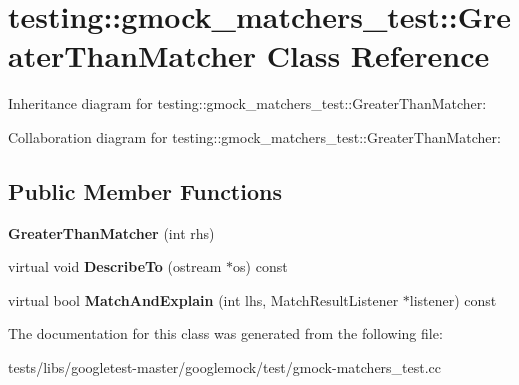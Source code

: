 \hypertarget{classtesting_1_1gmock__matchers__test_1_1GreaterThanMatcher}{}\section{testing\+:\+:gmock\+\_\+matchers\+\_\+test\+:\+:Greater\+Than\+Matcher Class Reference}
\label{classtesting_1_1gmock__matchers__test_1_1GreaterThanMatcher}


Inheritance diagram for testing\+:\+:gmock\+\_\+matchers\+\_\+test\+:\+:Greater\+Than\+Matcher\+:


Collaboration diagram for testing\+:\+:gmock\+\_\+matchers\+\_\+test\+:\+:Greater\+Than\+Matcher\+:
\subsection*{Public Member Functions}
\begin{DoxyCompactItemize}
\item 
\mbox{\label{classtesting_1_1gmock__matchers__test_1_1GreaterThanMatcher_a605c50137599a1dba0701bbd735bf1e8}} 
{\bfseries Greater\+Than\+Matcher} (int rhs)
\item 
\mbox{\label{classtesting_1_1gmock__matchers__test_1_1GreaterThanMatcher_a49ea904382d0f5b80ccf622423ab0d94}} 
virtual void {\bfseries Describe\+To} (ostream $\ast$os) const
\item 
\mbox{\label{classtesting_1_1gmock__matchers__test_1_1GreaterThanMatcher_a85a583852003638507d872238bcf7c0f}} 
virtual bool {\bfseries Match\+And\+Explain} (int lhs, Match\+Result\+Listener $\ast$listener) const
\end{DoxyCompactItemize}


The documentation for this class was generated from the following file\+:\begin{DoxyCompactItemize}
\item 
tests/libs/googletest-\/master/googlemock/test/gmock-\/matchers\+\_\+test.\+cc\end{DoxyCompactItemize}
